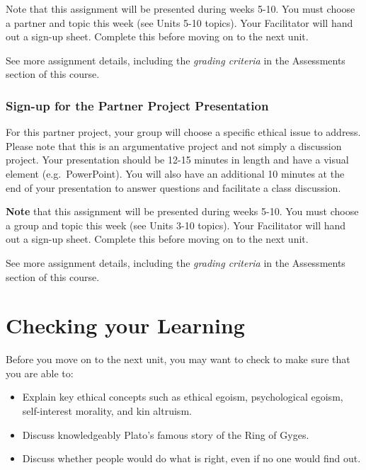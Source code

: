\documentclass[
]{book}
\providecommand{\tightlist}{%
  \setlength{\itemsep}{0pt}\setlength{\parskip}{0pt}}
\begin{document}
\begin{assessment}
Note that this assignment will be presented during weeks 5-10. You must choose a partner and topic this week (see Units 5-10 topics). Your Facilitator will hand out a sign-up sheet. Complete this before moving on to the next unit.

See more assignment details, including the \emph{grading criteria} in the Assessments section of this course.

\hypertarget{sign-up-for-the-partner-project-presentation}{%
\subsubsection*{Sign-up for the Partner Project Presentation}\label{sign-up-for-the-partner-project-presentation}}

For this partner project, your group will choose a specific ethical issue to address.
Please note that this is an argumentative project and not simply a discussion
project. Your presentation should be 12-15 minutes in length and have a visual
element (e.g.~PowerPoint). You will also have an additional 10 minutes at the
end of your presentation to answer questions and facilitate a class discussion.
\end{assessment}

\begin{caution}
\textbf{Note} that this assignment will be presented during weeks 5-10. You must choose a group and topic this week (see Units 3-10 topics). Your Facilitator will hand out a sign-up sheet. Complete this before moving on to the next unit.
\end{caution}

See more assignment details, including the \emph{grading criteria} in the Assessments section of this course.

\hypertarget{checking-your-learning-2}{%
\section*{Checking your Learning}\label{checking-your-learning-2}}

\begin{progress}
Before you move on to the next unit, you may want to check to make sure that you are able to:

\begin{itemize}
\tightlist
\item
  Explain key ethical concepts such as ethical egoism, psychological egoism, self-interest morality, and kin altruism.\\
\item
  Discuss knowledgeably Plato's famous story of the Ring of Gyges.\\
\item
  Discuss whether people would do what is right, even if no one would find out.
\end{itemize}
\end{progress}
\end{document}
